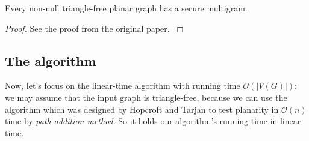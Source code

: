\begin{theorem}
Every non-null triangle-free planar graph has a secure multigram.
\end{theorem}
\begin{proof}
See the proof from the original paper. \cite{dvorak2013threecoloring}
\end{proof}

\subsection{The algorithm}
Now, let's focus on the linear-time algorithm with running time $\mathcal{O}(|V(G)|)$:
we may assume that the input graph is triangle-free, because we can use the algorithm which was designed by Hopcroft and Tarjan \cite{10.1145/321850.321852} to test planarity in $\mathcal{O}(n)$ time by \textit{path addition method}. So it holds our algorithm's running time in linear-time. 
\newcommand\mycommfont[1]{\footnotesize\ttfamily\textcolor{blue}{#1}}


